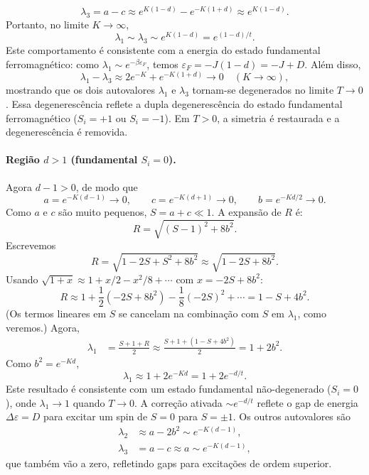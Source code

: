 \documentclass[11pt,a4paper]{article}
\begin{document}
%
\begin{equation}
    \lambda_3 = a - c \approx e^{K(1-d)} - e^{-K(1+d)} \approx e^{K(1-d)}.
\end{equation}
%
Portanto, no limite $K \to \infty$,
%
\begin{equation}
    \boxed{
    \lambda_1 \sim \lambda_3 \sim e^{K(1-d)} = e^{(1-d)/t}.
    }
\end{equation}
%
Este comportamento é consistente com a energia do estado fundamental ferromagnético: como $\lambda_1 \sim e^{-\beta \varepsilon_F}$, temos $\varepsilon_F = -J(1-d) = -J + D$.
%
Além disso,
%
\begin{equation}
    \lambda_1 - \lambda_3 \approx 2 e^{-K} + e^{-K(1+d)} \to 0 \quad (K \to \infty),
\end{equation}
%
mostrando que os dois autovalores $\lambda_1$ e $\lambda_3$ tornam-se degenerados no limite $T \to 0$. Essa degenerescência reflete a dupla degenerescência do estado fundamental ferromagnético ($S_i = +1$ ou $S_i = -1$). Em $T > 0$, a simetria é restaurada e a degenerescência é removida.
%
\paragraph{Região $d > 1$ (fundamental $S_i = 0$).}
%
Agora $d - 1 > 0$, de modo que
%
\begin{equation}
    a = e^{-K(d-1)} \to 0, \qquad c = e^{-K(d+1)} \to 0, \qquad b = e^{-Kd/2} \to 0.
\end{equation}
%
Como $a$ e $c$ são muito pequenos, $S = a + c \ll 1$. A expansão de $R$ é:
%
\begin{equation}
    R = \sqrt{(S - 1)^2 + 8b^2}.
\end{equation}
%
Escrevemos
%
\begin{equation}
    R = \sqrt{1 - 2S + S^2 + 8b^2} \approx \sqrt{1 - 2S + 8b^2}.
\end{equation}
%
Usando $\sqrt{1 + x} \approx 1 + x/2 - x^2/8 + \cdots$ com $x = -2S + 8b^2$:
%
\begin{equation}
    R \approx 1 + \frac{1}{2}(-2S + 8b^2) - \frac{1}{8}(-2S)^2 + \cdots
    = 1 - S + 4b^2.
\end{equation}
%
(Os termos lineares em $S$ se cancelam na combinação com $S$ em $\lambda_1$, como veremos.)
%
Agora,
%
\begin{align}
    \lambda_1 &= \frac{S + 1 + R}{2}
    \approx \frac{S + 1 + (1 - S + 4b^2)}{2}
    = 1 + 2b^2.
\end{align}
%
Como $b^2 = e^{-Kd}$,
%
\begin{equation}
    \boxed{
    \lambda_1 \approx 1 + 2 e^{-Kd} = 1 + 2 e^{-d/t}.
    }
\end{equation}
%
Este resultado é consistente com um estado fundamental não-degenerado ($S_i = 0$), onde $\lambda_1 \to 1$ quando $T \to 0$. A correção ativada $\sim e^{-d/t}$ reflete o gap de energia $\Delta \varepsilon = D$ para excitar um spin de $S=0$ para $S=\pm 1$.
%
Os outros autovalores são
%
\begin{align}
    \lambda_2 &\approx a - 2b^2 \sim e^{-K(d-1)}, \\
    \lambda_3 &= a - c \approx a \sim e^{-K(d-1)},
\end{align}
%
que também vão a zero, refletindo gaps para excitações de ordem superior.
%
\end{document}
